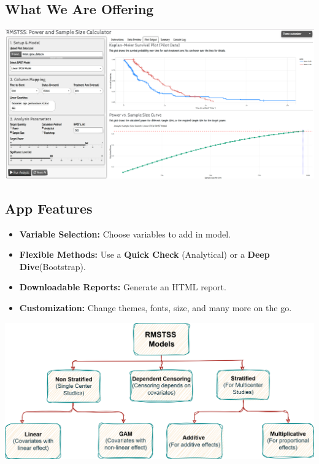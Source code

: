 \documentclass[a0,landscape]{a0poster}
\begin{document}
\begin{minipage}[t]{0.54\linewidth}
    \subsection*{\color{HeadingColor}\Large What We Are Offering}
    {\centering \includegraphics[width=\linewidth,height = 0.58\linewidth]{images/app-ss.png}\par}
    
\vspace{0.2cm}    

    \subsection*{\color{HeadingColor}\Large App Features}
    \begin{itemize}
        \item[{\color{BulletColor}\Large\checkmark}] \Large \textbf{Variable Selection:} Choose variables to add in model.
        \item[{\color{BulletColor}\Large\checkmark}] \Large \textbf{Flexible Methods:} Use a \textbf{Quick Check} (Analytical) or a \textbf{Deep Dive}(Bootstrap).
        \item[{\color{BulletColor}\Large\checkmark}] \Large \textbf{Downloadable Reports:} Generate an HTML report.
        \item[{\color{BulletColor}\Large\checkmark}] \Large \textbf{Customization:} Change themes, fonts, size, and many more on the go.
    \end{itemize}
\vspace{0.2cm}    
    {\centering \includegraphics[width=\linewidth]{images/app-models.png}\par}
    
\end{minipage}
\end{document}

